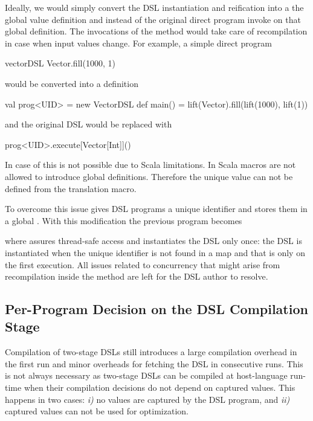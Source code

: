 Ideally, we would simply convert the DSL instantiation and reification into a the global value definition and
instead of the original direct program invoke  on that global definition. The
invocations of the  method would take care of recompilation in case when
input values change. For example, a simple direct program\begin{lstparagraph}
vectorDSL { Vector.fill(1000, 1) }
\end{lstparagraph} would be converted into a definition\begin{lstparagraph}
val prog<UID> = new VectorDSL {
  def main() = lift(Vector).fill(lift(1000), lift(1))
}
\end{lstparagraph}
and the original DSL would be replaced with\begin{lstparagraph}
prog<UID>.execute[Vector[Int]]()
\end{lstparagraph}


In case of \yy this is not possible due to Scala limitations. In Scala macros are
not allowed to introduce global definitions. Therefore the unique value  can
not be defined from the translation macro.

To overcome this issue \yy gives DSL programs a unique identifier and stores them
 in a global . With this modification the previous program becomes\begin{lstparagraph}
val prog = YYStorage.programs.computeIfAbsent(<UID>, { _ =>
  new VectorDSL {
    def main() = lift(Vector).fill(lift(1000), lift(1))
})
prog.execute[Vector[Int]]()
\end{lstparagraph}
where  assures thread-safe access and instantiates the DSL only once: the DSL is instantiated
 when the unique identifier is not found in a map and that is only on the first execution.
 All issues related to concurrency that might arise from recompilation inside the 
 method are left for the DSL author to resolve.



\subsection{Per-Program Decision on the DSL Compilation Stage}
\label{sec:per-program-decision}

Compilation of two-stage DSLs still introduces a large compilation overhead in the first run
 and minor overheads for fetching the DSL in consecutive runs. This is not always necessary
 as two-stage DSLs can be compiled at host-language run-time when their compilation decisions
 do not depend on captured values. This happens in two cases: \emph{i)} no values are captured by the DSL program,
 and \emph{ii)} captured values can not be used for optimization.


